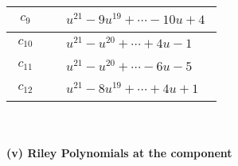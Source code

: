 \documentclass[1p]{elsarticle_modified}
\theoremstyle{definition}
\begin{document}
\begin{tabular}{m{50pt}|m{274pt}}
\hline $$\begin{aligned}c_{9}\end{aligned}$$&$\begin{aligned}
&u^{21}-9 u^{19}+\cdots-10 u+4
\end{aligned}$\\
\hline $$\begin{aligned}c_{10}\end{aligned}$$&$\begin{aligned}
&u^{21}- u^{20}+\cdots+4 u-1
\end{aligned}$\\
\hline $$\begin{aligned}c_{11}\end{aligned}$$&$\begin{aligned}
&u^{21}- u^{20}+\cdots-6 u-5
\end{aligned}$\\
\hline $$\begin{aligned}c_{12}\end{aligned}$$&$\begin{aligned}
&u^{21}-8 u^{19}+\cdots+4 u+1
\end{aligned}$\\
\hline
\end{tabular}\\~\\
\newpage\renewcommand{\arraystretch}{1}
\flushleft \textbf{(v) Riley Polynomials at the component}\newline \\
\end{document}
